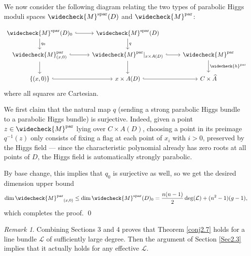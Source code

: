\documentclass[11pt]{amsart}
\theoremstyle{plain}
\theoremstyle{definition}
\theoremstyle{remark}
\newtheorem{rmk}[thm]{Remark}
\newcommand{\CL}{{\mathcal L}}
\begin{document}
We now consider the following diagram relating the two types of parabolic Higgs moduli spaces $\widecheck{M}^{\mathrm{spar}}(D)$ and 
$\widecheck{M}^{\mathrm{par}}$:

\begin{equation}\label{diagram}
\begin{tikzcd}
\widecheck{M}^{\mathrm{spar}}(D)_0 \arrow{d}{q_0}\arrow[r,hook]
&\widecheck{M}^{\mathrm{spar}}(D)\arrow{d}{q}
& 
\\
\widecheck{M}^{\mathrm{par}}_{(x,0)}\arrow{d}\arrow[r, hook]&
{\widecheck{M}^{\mathrm{par}}}|_{x \times A(D)} \arrow{d}\arrow[r,hook]&
\widecheck{M}^{\mathrm{par}}\arrow[d,"\widecheck{h}^{\mathrm{par}}"]\\
\{(x,0)\} \arrow[r, hook] & x \times A(D)  \arrow[r, hook] & C\times \widehat{A}
\end{tikzcd}
\end{equation}
where all squares are Cartesian.  

We first claim that the natural map $q$ (sending a strong parabolic Higgs bundle to a parabolic Higgs bundle) is surjective. Indeed, given a point $z \in \widecheck{M}^{\mathrm{par}}$ lying over $C\times {A}(D)$,
choosing a point in its preimage $q^{-1}(z)$ only consists of fixing a flag at each point of $x_i$ with $i>0$, preserved by the Higgs field --- since the characteristic polynomial already has zero roots at all points of $D$, the Higgs field is automatically strongly parabolic.


By base change, this implies that $q_0$ is surjective as well, so we get the desired dimension upper bound
\[
\dim {\widecheck{M}^{\mathrm{par}}}_{(x,0)} \leq \dim \widecheck{M}^{\mathrm{spar}}(D)_0 = \frac{n(n-1)}{2}\deg (\CL) + (n^2-1)(g-1),
\]
which completes the proof. \qed


\begin{rmk}
Combining Sections 3 and 4 proves that Theorem \ref{conj2.7} holds for a line bundle $\CL$ of sufficiently large degree. Then the argument of Section \ref{Sec2.3} implies that it actually holds for any effective $\CL$.
\end{rmk}
\end{document}
